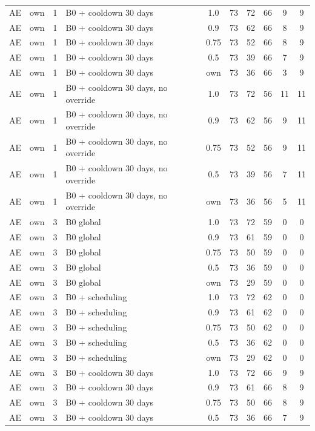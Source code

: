 \begin{longtable}{lllp{4.4cm}cccccc}
AE & own & 1 & B0 + cooldown 30 days & 1.0 & 73 & 72 & 66 & 9 & 9 \\
AE & own & 1 & B0 + cooldown 30 days & 0.9 & 73 & 62 & 66 & 8 & 9 \\
AE & own & 1 & B0 + cooldown 30 days & 0.75 & 73 & 52 & 66 & 8 & 9 \\
AE & own & 1 & B0 + cooldown 30 days & 0.5 & 73 & 39 & 66 & 7 & 9 \\
AE & own & 1 & B0 + cooldown 30 days & own & 73 & 36 & 66 & 3 & 9 \\
AE & own & 1 & B0 + cooldown 30 days, no override & 1.0 & 73 & 72 & 56 & 11 & 11 \\
AE & own & 1 & B0 + cooldown 30 days, no override & 0.9 & 73 & 62 & 56 & 9 & 11 \\
AE & own & 1 & B0 + cooldown 30 days, no override & 0.75 & 73 & 52 & 56 & 9 & 11 \\
AE & own & 1 & B0 + cooldown 30 days, no override & 0.5 & 73 & 39 & 56 & 7 & 11 \\
AE & own & 1 & B0 + cooldown 30 days, no override & own & 73 & 36 & 56 & 5 & 11 \\
AE & own & 3 & B0 global & 1.0 & 73 & 72 & 59 & 0 & 0 \\
AE & own & 3 & B0 global & 0.9 & 73 & 61 & 59 & 0 & 0 \\
AE & own & 3 & B0 global & 0.75 & 73 & 50 & 59 & 0 & 0 \\
AE & own & 3 & B0 global & 0.5 & 73 & 36 & 59 & 0 & 0 \\
AE & own & 3 & B0 global & own & 73 & 29 & 59 & 0 & 0 \\
AE & own & 3 & B0 + scheduling & 1.0 & 73 & 72 & 62 & 0 & 0 \\
AE & own & 3 & B0 + scheduling & 0.9 & 73 & 61 & 62 & 0 & 0 \\
AE & own & 3 & B0 + scheduling & 0.75 & 73 & 50 & 62 & 0 & 0 \\
AE & own & 3 & B0 + scheduling & 0.5 & 73 & 36 & 62 & 0 & 0 \\
AE & own & 3 & B0 + scheduling & own & 73 & 29 & 62 & 0 & 0 \\
AE & own & 3 & B0 + cooldown 30 days & 1.0 & 73 & 72 & 66 & 9 & 9 \\
AE & own & 3 & B0 + cooldown 30 days & 0.9 & 73 & 61 & 66 & 8 & 9 \\
AE & own & 3 & B0 + cooldown 30 days & 0.75 & 73 & 50 & 66 & 8 & 9 \\
AE & own & 3 & B0 + cooldown 30 days & 0.5 & 73 & 36 & 66 & 7 & 9 \\

\end{longtable}
